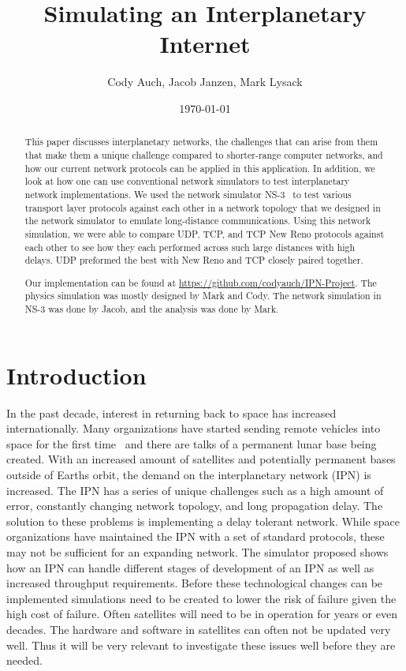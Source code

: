 \documentclass[a4paper,12pt]{article}
\title{Simulating an Interplanetary Internet}
\author{Cody Auch, Jacob Janzen, Mark Lysack}
\date{\today}
\begin{document}
\maketitle

\begin{abstract}
  This paper discusses interplanetary networks, the challenges that can arise
  from them that make them a unique challenge compared to shorter-range computer
  networks, and how our current network protocols can be applied in this
  application. In addition, we look at how one can use conventional network
  simulators to test interplanetary network implementations. We used the network
  simulator NS-3~\cite{ns-3} to test various transport layer protocols against
  each other in a network topology that we designed in the network simulator to
  emulate long-distance communications. Using this network simulation, we were
  able to compare UDP, TCP, and TCP New Reno protocols against each other to see
  how they each performed across such large distances with high delays. UDP
  preformed the best with New Reno and TCP closely paired together.

  Our implementation can be found
  at \url{https://github.com/codyauch/IPN-Project}. The physics simulation was
  mostly designed by Mark and Cody. The network simulation in NS-3 was done by
  Jacob, and the analysis was done by Mark.
\end{abstract}

\section{Introduction}

In the past decade, interest in returning back to space has increased
internationally. Many organizations have started sending remote vehicles into
space for the first time~%
and there are talks of a permanent lunar base being created. With an increased
amount of satellites and potentially permanent bases outside of Earths orbit,
the demand on the interplanetary network (IPN) is increased. The IPN has a
series of unique challenges such as a high amount of error, constantly changing
network topology, and long propagation delay. The solution to these problems is
implementing a delay tolerant network. While space organizations have maintained
the IPN with a set of standard protocols, these may not be sufficient for an
expanding network. The simulator proposed shows how an IPN can handle different
stages of development of an IPN as well as increased throughput requirements.
Before these technological changes can be implemented simulations need to be
created to lower the risk of failure given the high cost of failure. Often
satellites will need to be in operation for years or even decades. The hardware
and software in satellites can often not be updated very well. Thus it will be
very relevant to investigate these issues well before they are needed.
\end{document}

